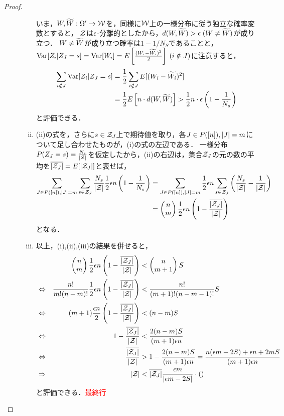 \documentclass[uplatex,dvipdfmx]{jsreport}
\begin{document}
\begin{proof}
\begin{description}
\begin{enumerate}[(i)]
            いま，$W,\widetilde{W}:\Omega'\to\mathcal{W}$を，同様に$\mathcal{W}$上の一様分布に従う独立な確率変数とすると，
            $\mathcal{Z}$は$\epsilon$-分離的としたから，$d(W,\widetilde{W})>\epsilon\;(W\ne\widetilde{W})$が成り立つ．
            $W\ne\widetilde{W}$が成り立つ確率は$1-1/N_S$であることと，$\mathrm{Var}[Z_i|Z_J=s]=\mathrm{Var}[W_i]=E\left[\frac{(W_i-\widetilde{W_i})^2}{2}\right]\;(i\notin J)$に注意すると，
            \begin{align*}
                \sum_{i\notin J}\mathrm{Var}[Z_i|Z_J=s]&=\frac{1}{2}\sum_{i\notin J}E[(W_i-\widetilde{W_i})^2]\\
                &=\frac{1}{2}E\left[n\cdot d(W,\widetilde{W})\right]>\frac{1}{2}n\cdot\epsilon\left(1-\frac{1}{N_s}\right)
            \end{align*}
            と評価できる．
            \item (ii)の式を，さらに$s\in\mathcal{Z}_J$上で期待値を取り，各$J\in P([n]),\lvert J\rvert=m$について足し合わせたものが，(i)の式の左辺である．
            一様分布$P(Z_J=s)=\frac{N_s}{\lvert\mathcal{Z}\rvert}$を仮定したから，(ii)の右辺は，集合$\mathcal{Z}_J$の元の数の平均を$\overline{\lvert\mathcal{Z}_J\rvert}=E[\lvert\mathcal{Z}_J\rvert]$と表せば，
            \begin{align*}
                \sum_{J\in P([n]),\lvert J\rvert=m}\sum_{s\in\mathcal{Z}_J}\frac{N_s}{\lvert\mathcal{Z}\rvert}\frac{1}{2}\epsilon n\left(1-\frac{1}{N_s}\right)&=\sum_{J\in P([n]),\lvert J\rvert=m}\frac{1}{2}\epsilon n\sum_{s\in\mathcal{Z}_J}\left(\frac{N_s}{\lvert\mathcal{Z}\rvert}-\frac{1}{\lvert\mathcal{Z}\rvert}\right)\\
                &=\begin{pmatrix}n\\m\end{pmatrix}\frac{1}{2}\epsilon n\left(1-\frac{\overline{\lvert\mathcal{Z}_J\rvert}}{\lvert\mathcal{Z}\rvert}\right)
            \end{align*}
            となる．
            \item 以上，(i),(ii),(iii)の結果を併せると，
            \begin{align*}
                &&\begin{pmatrix}n\\m\end{pmatrix}\frac{1}{2}\epsilon n\left(1-\frac{\overline{\lvert\mathcal{Z}_J\rvert}}{\lvert\mathcal{Z}\rvert}\right)&<\begin{pmatrix}n\\m+1\end{pmatrix}S\\
                &\Leftrightarrow&\frac{n!}{m!(n-m)!}\frac{1}{2}\epsilon n\left(1-\frac{\overline{\lvert\mathcal{Z}_J\rvert}}{\lvert\mathcal{Z}\rvert}\right)&<\frac{n!}{(m+1)!(n-m-1)!}S\\
                &\Leftrightarrow&(m+1)\frac{\epsilon n}{2}\left(1-\frac{\overline{\lvert\mathcal{Z}_J\rvert}}{\lvert\mathcal{Z}\rvert}\right)&<(n-m)S\\
                &\Leftrightarrow&1-\frac{\overline{\lvert\mathcal{Z}_J\rvert}}{\lvert\mathcal{Z}\rvert}&<\frac{2(n-m)S}{(m+1)\epsilon n}\\
                &\Leftrightarrow&\frac{\overline{\lvert\mathcal{Z}_J\rvert}}{\lvert\mathcal{Z}\rvert}&>1-\frac{2(n-m)S}{(m+1)\epsilon n}=\frac{n(\epsilon m-2S)+\epsilon n+2mS}{(m+1)\epsilon n}\\
                &\Rightarrow&\lvert\mathcal{Z}\rvert&<\overline{\lvert\mathcal{Z}_J\rvert}\frac{\epsilon m}{\lvert\epsilon m-2S\rvert}\cdot\left(\right)
            \end{align*}
            と評価できる．\textcolor{red}{最終行}


\end{enumerate}
\end{description}
\end{proof}
\end{document}
